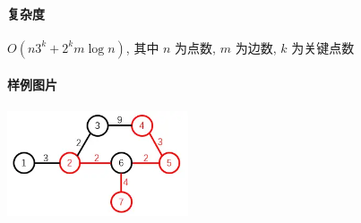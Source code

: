 \paragraph{复杂度} \(O\left(n3^k+2^km\log n\right)\), 其中 \(n\) 为点数, \(m\) 为边数, \(k\) 为关键点数

\paragraph{样例图片}

\begin{center}
    \includegraphics[width=0.4\textwidth]{img/luogu-P6192-1.png}
\end{center}